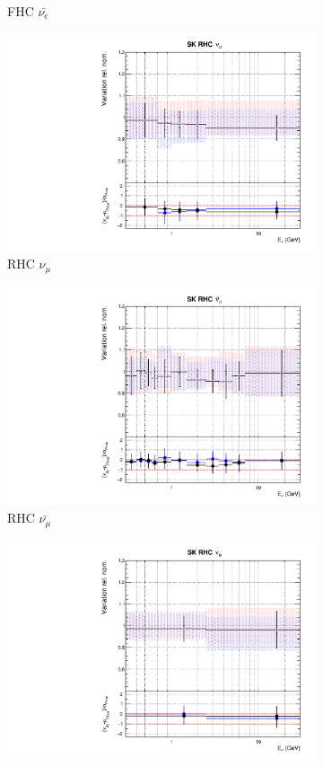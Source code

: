 \begin{figure}[t]
\begin{subfigure}{0.42\textwidth}
  \caption{\SK FHC $\bar{\nu_e}$}
\end{subfigure}
\begin{subfigure}{0.42\textwidth}
  \centering
  \includegraphics[width=0.75\linewidth]{figs/rhcmpasmvflux12}
  \caption{\SK RHC $\nu_{\mu}$}
\end{subfigure}
\begin{subfigure}{0.42\textwidth}
  \centering
  \includegraphics[width=0.75\linewidth]{figs/rhcmpasmvflux13}
  \caption{\SK RHC $\bar{\nu_{\mu}}$}
\end{subfigure}
\begin{subfigure}{0.42\textwidth}
  \centering
  \includegraphics[width=0.75\linewidth]{figs/rhcmpasmvflux14}

\end{subfigure}
\end{figure}
